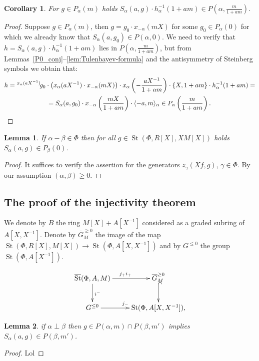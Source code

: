 \documentclass[oneside, 8pt]{amsart}
\newtheorem{corollary}{Corollary}
\newtheorem{lemma}{Lemma}
\theoremstyle{remark}
\theoremstyle{definition}
\DeclareMathOperator{\St}{St}
\numberwithin{equation}{section}
\begin{document}
\begin{corollary} For $g \in P_\alpha(m)$ holds $S_\alpha(a, g) \cdot h_\alpha^{-1}(1 + am) \in P(\alpha, \frac{m}{1 + am})$. \end{corollary}
\begin{proof}
Suppose $g \in P_\alpha(m)$, then $g = g_0 \cdot x_{-\alpha}(mX)$ for some $g_0 \in P_\alpha(0)$ for which we already know that $S_\alpha(a, g_0) \in P(\alpha, 0)$.
We need to verify that $h = S_\alpha(a, g) \cdot h_\alpha^{-1}(1 + am)$ lies in $P\left(\alpha, \frac{m}{1 + am}\right)$, but from Lemmas~\ref{P0_conj}--\ref{lem:Tulenbayev-formula} and the antisymmetry of Steinberg symbols we obtain that:
\begin{multline} \nonumber h = {}^{x_\alpha(aX^{-1})}\!g_0 \cdot \left(x_{\alpha}(aX^{-1}) \cdot x_{-\alpha}(mX)\right) \cdot x_{\alpha}\left(-\frac{aX^{-1}}{1+am}\right) \cdot \{X, 1+am\} \cdot h_\alpha^{-1}(1 + am) = \\
= S_\alpha(a, g_0) \cdot x_{-\alpha}\left(\frac{mX}{1+am}\right) \cdot \langle -a, m\rangle_\alpha \in P_\alpha\left(\frac{m}{1+am}\right).\qedhere \end{multline}
\end{proof}

\begin{lemma} If $\alpha - \beta \in \Phi$ then for all $g \in \St(\Phi, R[X], XM[X])$ holds $S_\alpha(a, g) \in P_\beta(0)$. \end{lemma}
\begin{proof}
It suffices to verify the assertion for the generators $z_\gamma(Xf, g)$, $\gamma \in \Phi$.
By our assumption $(\alpha, \beta) \geq 0$. 
\end{proof}

\subsection{The proof of the injectivity theorem}
We denote by $B$ the ring $M[X] + A[X^{-1}]$ considered as a graded subring of $A[X, X^{-1}]$.
Denote by $\overline{G}^{\geq 0}_M$ the image of the map $\St(\Phi, R[X], M[X]) \to \St(\Phi, A[X, X^{-1}])$ and by
 $G^{\leq 0}$ the group $\St(\Phi, A[X^{-1}])$.

\[ \xymatrix{ \overline{\St}(\Phi, A, M) \ar[r]^{j_+i_+} \ar[d]^{i^-} & \overline{G}_M^{\geq 0} \ar@{^{(}->}[d] \\
              G^{\leq 0} \ar[r]^{j_-} & \St(\Phi, A[X, X^{-1}]), } \] 

\begin{lemma} if $\alpha \perp \beta$ then $g \in P(\alpha, m) \cap P(\beta, m')$ implies $S_\alpha(a, g) \in P(\beta, m')$. \end{lemma}
\begin{proof}
 Lol
\end{proof}
\end{document}
